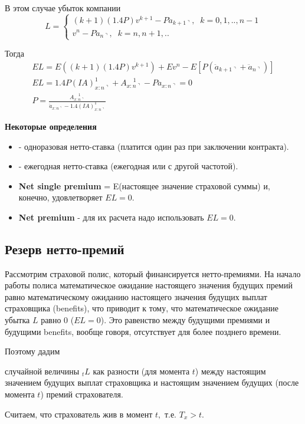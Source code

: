 \begin{enumerate}
\begin{example}
		В этом случае убыток компании 
		\[
				L=\begin{cases}
					(k+1)(1.4P)v^{k+1} - P \ddot{a}_{k+1\urcorner}, \;\; k=0,1,..,n-1\\
					v^n- P\ddot{a}_{n\urcorner}, \;\; k=n, n+1,..
				\end{cases}
		\]	

		Тогда 
		\begin{gather*}
			EL = E((k+1)(1.4P)v^{k+1}) + Ev^n - E[P(\ddot{a}_{k+1\urcorner} + \ddot{a}_{n\urcorner})]\\
			EL = 1.4P (IA)_{x:n\urcorner}^{1} + A_{x:n\urcorner}^{\;\;\;\;1} -P \ddot{a}_{x:n\urcorner} = 0\\
			P = \frac{A_{x:n\urcorner}^{\;\;\;\;1}}{\ddot{a}_{x:n\urcorner}- 1.4(IA)_{x:n\urcorner}^{1}}
		\end{gather*}
	\end{example}	
\end{enumerate}

\textbf{Некоторые определения}
\begin{itemize}
	\item {} - одноразовая нетто-ставка (платится один раз при заключении контракта).
	\item {} - ежегодная нетто-ставка (ежегодная или с другой частотой).
	\item \textbf{Net single premium} = E(настоящее значение страховой суммы) и, конечно, удовлетворяет  $ EL = 0.$
	\item \textbf{Net premium} - для их расчета надо использовать  $ EL = 0.$
\end{itemize}

\subsection{Резерв нетто-премий} %
Рассмотрим страховой полис, который финансируется нетто-премиями. На начало работы полиса математическое ожидание настоящего значения будущих премий равно математическому ожиданию настоящего значения будущих выплат страховщика (benefits), что приводит к тому, что математическое ожидание убытка $ L$ равно 0 ($ EL = 0$). Это равенство между будущими премиями и будущими benefits, вообще говоря, отсутствует для более позднего времени.

Поэтому дадим
\begin{definition}
	случайной величины $ {}_tL$ как разности (для момента $ t$) между настоящим значением будущих выплат страховщика и настоящим значением будущих (после момента $ t$) премий страхователя.
\end{definition}
Считаем, что страхователь жив в момент $ t,$ т.е. $ T_x > t$.

